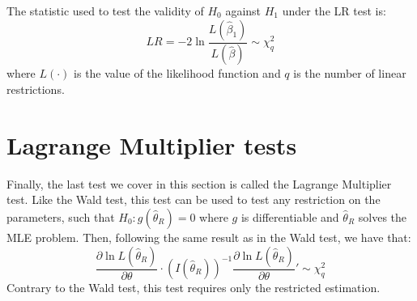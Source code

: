 \begin{proposition}
The statistic used to test the validity of $H_0$ against $H_1$ under the LR test is: $$LR = -2\ln\frac{L(\hat\beta_1)}{L(\hat\beta)} \sim \chi_q^2 $$ where $L(\cdot)$ is the value of the likelihood function and $q$ is the number of linear restrictions.
\end{proposition}

\section{Lagrange Multiplier tests}

Finally, the last test we cover in this section is called the Lagrange Multiplier test. Like the Wald test, this test can be used to test any restriction on the parameters, such that $H_0: g(\hat\theta_R) = 0$ where $g$ is differentiable and $\hat\theta_R$ solves the MLE problem. Then, following the same result as in the Wald test, we have that: $$ \frac{\partial \ln L(\hat\theta_R)}{\partial\theta}\cdot (I(\hat\theta_R))^{-1} \frac{\partial \ln L(\hat\theta_R)}{\partial\theta}' \sim \chi_q^2 $$
Contrary to the Wald test, this test requires only the restricted estimation.
